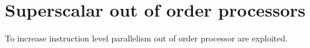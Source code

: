 


\section{Superscalar out of order processors}
To increase instruction level parallelism out of order processor are exploited.
